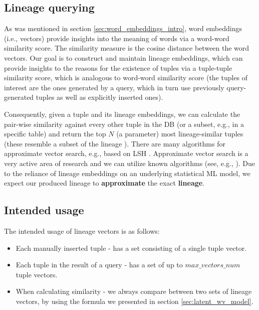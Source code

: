 \subsection{Lineage querying} As was mentioned in section \ref{sec:word_embeddings_intro}, word embeddings (i.e., vectors) provide insights into the meaning of words via a word-word similarity score. The similarity measure is the cosine distance between the word vectors. Our goal is to construct and maintain lineage embeddings, which can provide insights to the reasons for the existence of tuples via a tuple-tuple similarity score, which is analogous to word-word similarity score (the tuples of interest are the ones generated by a query, which in turn use previously query-generated tuples as well as explicitly inserted ones).
\par Consequently, given a tuple and its lineage embeddings, we can calculate the pair-wise similarity against every other tuple in the DB (or a subset, e.g., in a specific table) and return the top $N$ (a parameter) most lineage-similar tuples (these resemble a subset of the lineage \cite{Cui:2000:TLV:357775.357777}). 
There are many algorithms for approximate vector search, e.g., based on LSH \cite{lsh}. Approximate vector search is a very active area of research and we can utilize known algorithms (see, e.g., \cite{sugawara-etal-2016-approximately}).
Due to the reliance of lineage embeddings on an underlying statistical ML model, we expect our produced lineage to \textbf{approximate} the exact \textbf{lineage}.\\


\subsection{Intended usage} The intended usage of lineage vectors is as follows:
\begin{itemize}
    \item Each manually inserted tuple - has a set consisting of a single tuple vector.
    \item Each tuple in the result of a query - has a set of up to $max\_vectors\_num$ tuple vectors.
    \item When calculating similarity - we always compare between two sets of lineage vectors, by using the formula we presented in section \ref{sec:latent_wv_model}.
\end{itemize}
